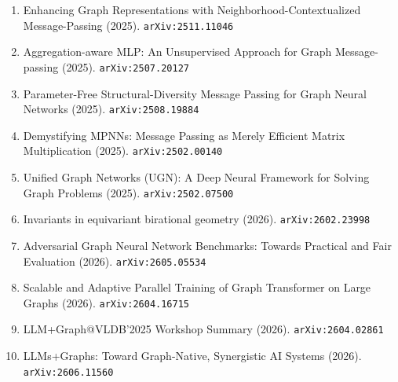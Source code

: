\documentclass[11pt]{article}
\begin{document}
\begin{enumerate}
  \item Enhancing Graph Representations with Neighborhood-Contextualized Message-Passing (2025). \texttt{arXiv:2511.11046}
  \item Aggregation-aware MLP: An Unsupervised Approach for Graph Message-passing (2025). \texttt{arXiv:2507.20127}
  \item Parameter-Free Structural-Diversity Message Passing for Graph Neural Networks (2025). \texttt{arXiv:2508.19884}
  \item Demystifying MPNNs: Message Passing as Merely Efficient Matrix
  Multiplication (2025). \texttt{arXiv:2502.00140}
  \item Unified Graph Networks (UGN): A Deep Neural Framework for Solving Graph
  Problems (2025). \texttt{arXiv:2502.07500}
  \item Invariants in equivariant birational geometry (2026). \texttt{arXiv:2602.23998}
  \item Adversarial Graph Neural Network Benchmarks: Towards Practical and Fair Evaluation (2026). \texttt{arXiv:2605.05534}
  \item Scalable and Adaptive Parallel Training of Graph Transformer on Large Graphs (2026). \texttt{arXiv:2604.16715}
  \item LLM+Graph@VLDB'2025 Workshop Summary (2026). \texttt{arXiv:2604.02861}
  \item LLMs+Graphs: Toward Graph-Native, Synergistic AI Systems (2026). \texttt{arXiv:2606.11560}
\end{enumerate}
\end{document}
